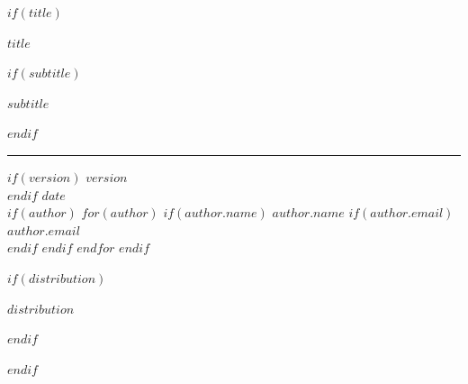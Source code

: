 \documentclass[
    $if(fontsize)$$fontsize$$else$10pt$endif$,
    $if(papersize)$$papersize$$else$letterpaper$endif$,
    titlepage,
    oneside,
    openright,
    $if(is_draft)$draft$else$final$endif$,
    article]{memoir}
\begin{document}
%
$if(title)$
    \ifpdf
    \fi
    \newlength{\centeroffset}
    \thispagestyle{empty}
    \vspace*{1.5in}
    \begin{flushright}
        {
            {\fontsize{20pt}{24pt}$title$\par}
            $if(subtitle)$
                \vspace{0.0in}
                {\fontsize{18pt}{21.6pt}$subtitle$\par}
            $endif$
        }
        \noindent\rule[$beforetitlerule$]{\textwidth}{1pt}

        \vspace{$aftertitlerule$}
        $if(version)$
            {\fontsize{12pt}{14.4pt}
                \space $version$\\[0.05in]
            }
        $endif$
        {\fontsize{12pt}{14.4pt}$date$}\\[0.05in]


        \vspace{2.5in}
        $if(author)$
            $for(author)$
                $if(author.name)$
                    {\fontsize{12pt}{14.4pt}$author.name$}
                    $if(author.email)$
                        {\\\fontsize{12pt}{14.4pt}$author.email$\\[0.2in]}
                    $endif$
                $endif$
            $endfor$
        $endif$

        \vspace*{\fill}
        $if(distribution)$
            {\fontsize{9pt}{13.2pt}$distribution$\par}
        $endif$
    \end{flushright}
$endif$
\end{document}
